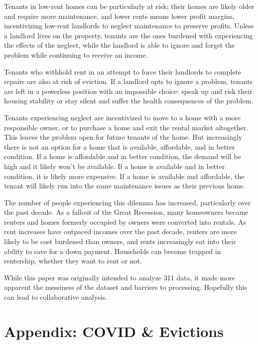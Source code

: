 \documentclass[
]{book}
\begin{document}
Tenants in low-rent homes can be particularly at risk; their homes are likely older and require more maintenance, and lower rents means lower profit margins, incentivizing low-rent landlords to neglect maintenance to preserve profits. Unless a landlord lives on the property, tenants are the ones burdened with experiencing the effects of the neglect, while the landlord is able to ignore and forget the problem while continuing to receive an income.

Tenants who withhold rent in an attempt to force their landlords to complete repairs are also at risk of eviction. If a landlord opts to ignore a problem, tenants are left in a powerless position with an impossible choice: speak up and risk their housing stability or stay silent and suffer the health consequences of the problem.

Tenants experiencing neglect are incentivized to move to a home with a more responsible owner, or to purchase a home and exit the rental market altogether. This leaves the problem open for future tenants of the home. But increasingly there is not an option for a home that is available, affordable, and in better condition. If a home is affordable and in better condition, the demand will be high and it likely won't be available. If a home is available and in better condition, it is likely more expensive. If a home is available and affordable, the tenant will likely run into the same maintenance issues as their previous home.

The number of people experiencing this dilemma has increased, particularly over the past decade. As a fallout of the Great Recession, many homeowners became renters and homes formerly occupied by owners were converted into rentals. As rent increases have outpaced incomes over the past decade, renters are more likely to be cost burdened than owners, and rents increasingly eat into their ability to save for a down payment. Households can become trapped in rentership, whether they want to rent or not.

While this paper was originally intended to analyze 311 data, it made more apparent the messiness of the dataset and barriers to processing. Hopefully this can lead to collaborative analysis.

\hypertarget{appendix-covid-evictions}{%
\chapter{Appendix: COVID \& Evictions}\label{appendix-covid-evictions}}
\end{document}
